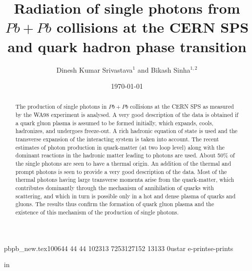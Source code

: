 pbpb_new.tex100644     44     44      102313  7253127152  13133 0ustar  e-printse-prints
%

%
 in
\tightenlines

\draft
%
%
\title{
 Radiation of single photons from $Pb+Pb$ collisions at the CERN
SPS and quark hadron phase transition}
%
\author{Dinesh Kumar Srivastava$^1$ and Bikash Sinha$^{1,2}$}
%
\address{$^1$Variable Energy Cyclotron Centre, 1/AF Bidhan Nagar, Calcutta 
700 064\\
$^2$Saha Institute of Nuclear Physics, 1/AF Bidhan Nagar, Calcutta
700 064 }
%
\date{\today}
\maketitle

\begin{abstract}
The production of single photons in $Pb+Pb$ collisions
at the CERN SPS as measured by the WA98 experiment is analysed.
A very good description of the data is obtained if a
quark gluon plasma is assumed to be formed initially, which expands,
cools, hadronizes, and undergoes  freeze-out.
A rich hadronic equation of state is used and the transverse expansion of the
interacting system is taken into account. The recent estimates of photon
production in quark-matter (at two loop level) along with the dominant
reactions in the hadronic matter leading to photons
are used. About 50\% of the single photons are seen to have a 
thermal origin. An addition of the thermal and prompt
photons is seen to provide a very good description of the data.
Most of the thermal photons  having large transverse momenta
arise from the quark-matter, which contributes dominantly through
the mechanism of annihilation of quarks with scattering, and which in turn
is possible only in a hot and dense plasma of quarks and gluons.
The results thus confirm the formation of quark gluon plasma
and the existence of this mechanism of the production of single
photons.

\end{abstract}
%
%
\narrowtext



